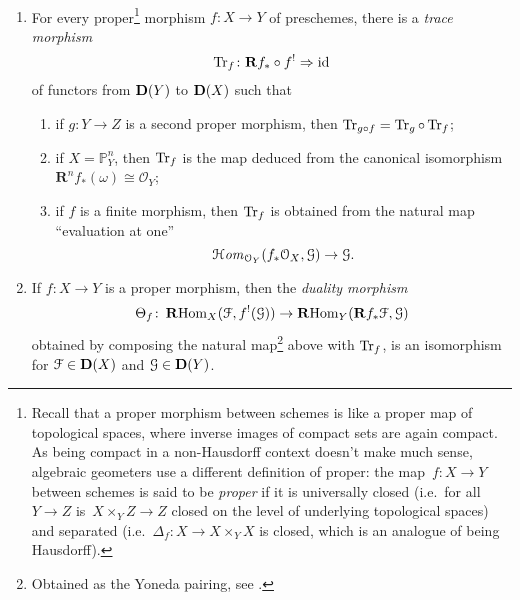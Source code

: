 \documentclass[10pt,a4paper]{article}
\begin{document}
\begin{theorem} {\ }
\begin{enumerate}
\begin{enumerate}
          \begin{equation}
            f^!(\mathcal{G})=\HHom_{\mathcal{O}_Y}(f_*\mathcal{O}_X,\mathcal{G}).
          \end{equation}
      \end{enumerate}
    \item\label{enumerate:classical-b} For every proper\footnote{Recall that a proper morphism between schemes is like a proper map of topological spaces, where inverse images of compact sets are again compact. As being compact in a non-Hausdorff context doesn't make much sense, algebraic geometers use a different definition of proper: the map~$f\colon X\to Y$ between schemes is said to be \emph{proper} if it is universally closed (i.e.\ for all~$Y\to Z$ is~$X\times_YZ\to Z$ closed on the level of underlying topological spaces) and separated (i.e.~$\Delta_f\colon X\to X\times_YX$ is closed, which is an analogue of being Hausdorff).} morphism $f\colon X\to Y$ of preschemes, there is a \emph{trace morphism}
      \begin{equation}
        \operatorname{Tr}_f\colon\mathbf{R} f_*\circ f^!\Rightarrow\mathrm{id}
      \end{equation}
      of functors from $\mathbf{D}(Y)$ to $\mathbf{D}(X)$ such that
      \begin{enumerate}
        \item\label{enumerate:classical-b-1} if $g\colon Y\to Z$ is a second proper morphism, then $\operatorname{Tr}_{g\circ f}=\operatorname{Tr}_g\circ\operatorname{Tr}_f$;
        \item\label{enumerate:classical-b-2} if $X=\mathbb{P}_Y^n$, then $\operatorname{Tr}_f$ is the map deduced from the canonical isomorphism $\mathbf{R}^nf_*(\omega)\cong\mathcal{O}_Y$;
        \item\label{enumerate:classical-b-3} if $f$ is a finite morphism, then $\operatorname{Tr}_f$ is obtained from the natural map ``evaluation at one''
          \begin{equation}
            \operatorname{\mathcal{H}\mathit{om}}_{\mathcal{O}_Y}(f_*\mathcal{O}_X,\mathcal{G})\to\mathcal{G}.
          \end{equation}
      \end{enumerate}
    \item\label{enumerate:classical-c} If $f\colon X\to Y$ is a proper morphism, then the \emph{duality morphism}
      \begin{equation}
        \label{equation:duality-morphism}
        \Theta_f\colon\operatorname{\mathbf{R}Hom}_X(\mathcal{F},f^!(\mathcal{G}))\to\operatorname{\mathbf{R}Hom}_Y(\mathbf{R}f_*\mathcal{F},\mathcal{G})
      \end{equation}
      obtained by composing the natural map\footnote{Obtained as the Yoneda pairing, see \cite[page 5]{hartshorne-residues-and-duality}.} above with $\operatorname{Tr}_f$, is an isomorphism for $\mathcal{F}\in\mathbf{D}(X)$ and $\mathcal{G}\in\mathbf{D}(Y)$.
  \end{enumerate}
\end{theorem}
\end{document}
